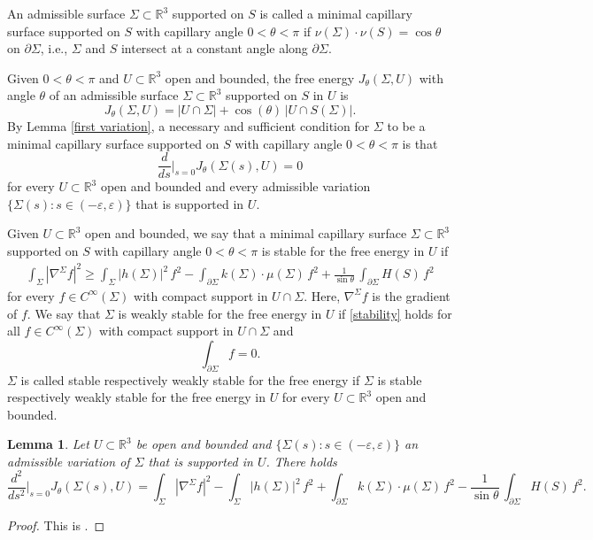 \documentclass[11pt]{amsart}
\newtheorem{lem}[prop]{Lemma}
\begin{document}
\begin{appendices}
	
	An admissible surface $\Sigma\subset \mathbb{R}^3$ supported on $S$ is called a minimal capillary surface supported on $S$ with capillary angle $0<\theta<\pi$ if $\nu(\Sigma)\cdot \nu(S)=\cos\theta$ on $\partial \Sigma$, i.e., $\Sigma$ and $S$ intersect at a constant angle along $\partial \Sigma$. 
	
Given $0<\theta<\pi$ and  $U\subset \mathbb{R}^3$ open and bounded, the free energy $J_\theta(\Sigma,U)$ with angle $\theta$ of an admissible surface $\Sigma\subset \mathbb{R}^3$ supported on $S$ in $U$ is 
$$
J_\theta(\Sigma,U)=|U\cap \Sigma|+\cos(\theta)\,|U\cap S(\Sigma)|.
$$
By Lemma \ref{first variation}, a necessary and sufficient condition for $\Sigma$ to be a minimal capillary surface supported on $S$ with capillary angle $0<\theta<\pi$ is that
$$
\frac{d}{ds}\bigg|_{s=0}J_\theta(\Sigma(s),U)=0
$$
for every  $U\subset \mathbb{R}^3$ open and bounded and every admissible variation $\{\Sigma(s):s\in(-\varepsilon,\varepsilon)\}$ that is supported in $U$.
	

	
Given  $U\subset \mathbb{R}^3$ open and bounded, we say that a minimal capillary surface $\Sigma\subset \mathbb{R}^3$ supported on $S$ with capillary angle $0<\theta<\pi$ is stable for the free energy in $U$ if
	\begin{align} \label{stability} 
\int_\Sigma |\nabla^\Sigma f|^2\geq 		\int_\Sigma |h(\Sigma)|^2\,f^2-\int_{\partial \Sigma} k(\Sigma)\cdot\mu(\Sigma)\,f^2+\frac{1}{\sin\theta}\,\int_{\partial \Sigma} H(S)\,f^2
	\end{align} 
	for every $f\in C^\infty(\Sigma)$ with compact support in $U\cap \Sigma$. 
	Here, 	 $\nabla^\Sigma f$ is the gradient of $f$. We say that $\Sigma$ is weakly stable for the free energy in $U$ if \eqref{stability} holds for all $f\in C^\infty(\Sigma)$ with compact support in $U\cap \Sigma$ and
$$
\int_{\partial \Sigma} f=0.
$$	
$\Sigma$ is called stable respectively weakly stable for the free energy if $\Sigma$ is  stable respectively weakly stable for the free energy in $U$ for every $U\subset \mathbb{R}^3$ open and bounded.
\begin{lem} \label{second derivative test}
Let $U\subset \mathbb{R}^3$ be open and bounded and $\{\Sigma(s):s\in(-\varepsilon,\varepsilon)\}$ an admissible variation of $\Sigma$ that is supported in $U$.	 There holds 	$$
	\frac{d^2}{ds^2}\bigg|_{s=0}J_\theta(\Sigma(s),U)=\int_\Sigma |\nabla^\Sigma f|^2- 		\int_\Sigma |h(\Sigma)|^2\,f^2+\int_{\partial \Sigma} k(\Sigma)\cdot\mu(\Sigma)\,f^2-\frac{1}{\sin\theta}\,\int_{\partial \Sigma} H(S)\,f^2.
	$$
\end{lem}
\begin{proof}
	This is \cite[(46)]{eichmair2024penrose}.
\end{proof}


\end{appendices}
\end{document}
